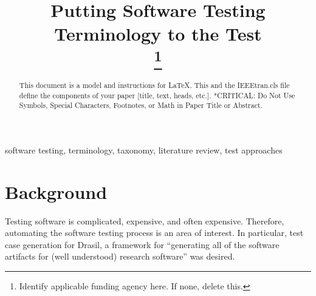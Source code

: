 \documentclass[conference]{IEEEtran}
\begin{document}
\title{Putting Software Testing Terminology to the Test\\
    \thanks{Identify applicable funding agency here. If none, delete this.}
}

\author{
    }



\maketitle

\begin{abstract}
    This document is a model and instructions for \LaTeX.
    This and the IEEEtran.cls file define the components of your paper [title, text, heads, etc.]. *CRITICAL: Do Not Use Symbols, Special Characters, Footnotes,
    or Math in Paper Title or Abstract.
\end{abstract}

\begin{IEEEkeywords}
    software testing, terminology, taxonomy, literature review, test approaches
\end{IEEEkeywords}

\section{Background}


Testing software is complicated, expensive, and often expensive. Therefore,
automating the software testing process is an area of interest. In particular,
test case generation for Drasil, a framework for ``generating all of the
software artifacts for (well understood) research software'' \cite{Drasil} was
desired.
\end{document}
